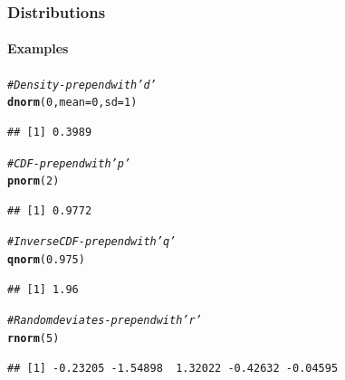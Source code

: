 \documentclass{beamer}\usepackage[]{graphicx}\usepackage[]{color}
\makeatletter
\newcommand{\hlnum}[1]{\textcolor[rgb]{0.686,0.059,0.569}{#1}}%
\newcommand{\hlcom}[1]{\textcolor[rgb]{0.678,0.584,0.686}{\textit{#1}}}%
\newcommand{\hlstd}[1]{\textcolor[rgb]{0.345,0.345,0.345}{#1}}%
\newcommand{\hlkwc}[1]{\textcolor[rgb]{0.333,0.667,0.333}{#1}}%
\newcommand{\hlkwd}[1]{\textcolor[rgb]{0.737,0.353,0.396}{\textbf{#1}}}%
\newenvironment{kframe}{%
 \def\at@end@of@kframe{}%
 \ifinner\ifhmode%
  \def\at@end@of@kframe{\end{minipage}}%
  \begin{minipage}{\columnwidth}%
 \fi\fi%
 \def\FrameCommand##1{\hskip\@totalleftmargin \hskip-\fboxsep
 \colorbox{shadecolor}{##1}\hskip-\fboxsep
     \hskip-\linewidth \hskip-\@totalleftmargin \hskip\columnwidth}%
 \MakeFramed {\advance\hsize-\width
   \@totalleftmargin\z@ \linewidth\hsize
   \@setminipage}}%
 {\par\unskip\endMakeFramed%
 \at@end@of@kframe}
\newenvironment{knitrout}{}{} %
\makeatother
\begin{document}
\begin{frame}[fragile]
    \frametitle{Distributions}
    \framesubtitle{Examples}
\begin{knitrout}\footnotesize
{}\color{fgcolor}\begin{kframe}
\begin{alltt}
\hlcom{# Density - prepend with 'd'}
\hlkwd{dnorm}\hlstd{(}\hlnum{0}\hlstd{,} \hlkwc{mean} \hlstd{=} \hlnum{0}\hlstd{,} \hlkwc{sd} \hlstd{=} \hlnum{1}\hlstd{)}
\end{alltt}
\begin{verbatim}
## [1] 0.3989
\end{verbatim}
\begin{alltt}
\hlcom{# CDF - prepend with 'p'}
\hlkwd{pnorm}\hlstd{(}\hlnum{2}\hlstd{)}
\end{alltt}
\begin{verbatim}
## [1] 0.9772
\end{verbatim}
\begin{alltt}
\hlcom{# Inverse CDF - prepend with 'q'}
\hlkwd{qnorm}\hlstd{(}\hlnum{0.975}\hlstd{)}
\end{alltt}
\begin{verbatim}
## [1] 1.96
\end{verbatim}
\begin{alltt}
\hlcom{# Random deviates - prepend with 'r'}
\hlkwd{rnorm}\hlstd{(}\hlnum{5}\hlstd{)}
\end{alltt}
\begin{verbatim}
## [1] -0.23205 -1.54898  1.32022 -0.42632 -0.04595
\end{verbatim}
\end{kframe}
\end{knitrout}

\end{frame}

%
%
\end{document}
